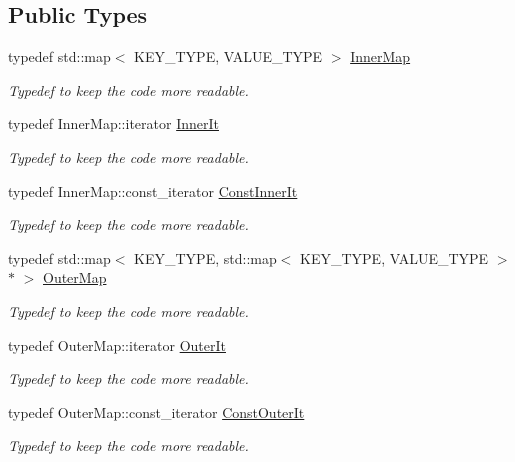 \subsection*{Public Types}
\begin{DoxyCompactItemize}
\item 
typedef std\+::map$<$ K\+E\+Y\+\_\+\+T\+Y\+PE, V\+A\+L\+U\+E\+\_\+\+T\+Y\+PE $>$ \hyperlink{classoomph_1_1MapMatrix_a9514409eb8ed5c6c3f3ceaa3d51e7eae}{Inner\+Map}
\begin{DoxyCompactList}\small\item\em Typedef to keep the code more readable. \end{DoxyCompactList}\item 
typedef Inner\+Map\+::iterator \hyperlink{classoomph_1_1MapMatrix_a23ece77bd36f3cdecf83c5ef7d490608}{Inner\+It}
\begin{DoxyCompactList}\small\item\em Typedef to keep the code more readable. \end{DoxyCompactList}\item 
typedef Inner\+Map\+::const\+\_\+iterator \hyperlink{classoomph_1_1MapMatrix_ac3738b797386c7ad5dbe170d3558ace9}{Const\+Inner\+It}
\begin{DoxyCompactList}\small\item\em Typedef to keep the code more readable. \end{DoxyCompactList}\item 
typedef std\+::map$<$ K\+E\+Y\+\_\+\+T\+Y\+PE, std\+::map$<$ K\+E\+Y\+\_\+\+T\+Y\+PE, V\+A\+L\+U\+E\+\_\+\+T\+Y\+PE $>$ $\ast$ $>$ \hyperlink{classoomph_1_1MapMatrix_af73388510565fa9af6b2946d23bd7709}{Outer\+Map}
\begin{DoxyCompactList}\small\item\em Typedef to keep the code more readable. \end{DoxyCompactList}\item 
typedef Outer\+Map\+::iterator \hyperlink{classoomph_1_1MapMatrix_a96c70b7ef6e89440c40648a6be9e4216}{Outer\+It}
\begin{DoxyCompactList}\small\item\em Typedef to keep the code more readable. \end{DoxyCompactList}\item 
typedef Outer\+Map\+::const\+\_\+iterator \hyperlink{classoomph_1_1MapMatrix_a795543d1b91f719b845b7588f7644eb3}{Const\+Outer\+It}
\begin{DoxyCompactList}\small\item\em Typedef to keep the code more readable. \end{DoxyCompactList}\end{DoxyCompactItemize}

